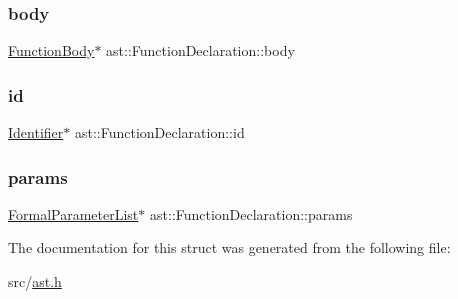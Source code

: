 \subsubsection{\texorpdfstring{body}{body}}
{\footnotesize\ttfamily \hyperlink{structast_1_1_function_body}{Function\+Body}$\ast$ ast\+::\+Function\+Declaration\+::body}

\mbox{\label{structast_1_1_function_declaration_aa593ce68ef88fb6cf977062b1af99ccd}} 
\subsubsection{\texorpdfstring{id}{id}}
{\footnotesize\ttfamily \hyperlink{structast_1_1_identifier}{Identifier}$\ast$ ast\+::\+Function\+Declaration\+::id}

\mbox{\label{structast_1_1_function_declaration_aff742e988b196183febb9b3acbe04739}} 
\subsubsection{\texorpdfstring{params}{params}}
{\footnotesize\ttfamily \hyperlink{structast_1_1_formal_parameter_list}{Formal\+Parameter\+List}$\ast$ ast\+::\+Function\+Declaration\+::params}



The documentation for this struct was generated from the following file\+:\begin{DoxyCompactItemize}
\item 
src/\hyperlink{ast_8h}{ast.\+h}\end{DoxyCompactItemize}
